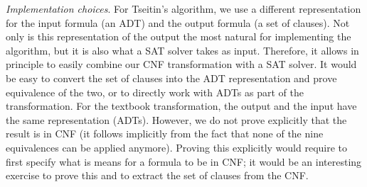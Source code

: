 \documentclass[12pt]{report}
\begin{document}





\emph{Implementation choices}. For Tseitin's algorithm, we use a
different representation for the input formula (an ADT) and the output
formula (a set of clauses). Not only is this representation of the
output the most natural for implementing the algorithm, but it is also
what a SAT solver takes as input. Therefore, it allows in principle to
easily combine our CNF transformation with a SAT solver. It would be
easy to convert the set of clauses into the ADT representation and
prove equivalence of the two, or to directly work with ADTs as part of
the transformation. For the textbook transformation, the output and
the input have the same representation (ADTs). However, we do not
prove explicitly that the result is in CNF (it follows implicitly from
the fact that none of the nine equivalences can be applied
anymore). Proving this explicitly would require to first specify what
is means for a formula to be in CNF; it would be an interesting
exercise to prove this and to extract the set of clauses from the CNF.
\end{document}
